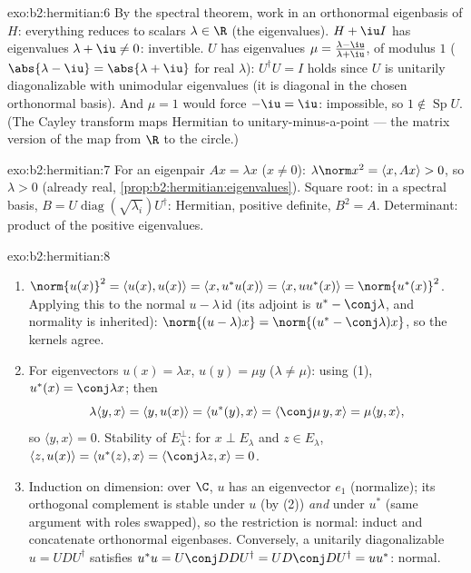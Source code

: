 \begin{solution}{exo:b2:hermitian:6}
By the spectral theorem, work in an orthonormal eigenbasis of $H$:
everything reduces to scalars $\lambda \in \R$ (the eigenvalues).
$H + \iu I$ has eigenvalues $\lambda + \iu \neq 0$: invertible. $U$
has eigenvalues $\mu = \frac{\lambda - \iu}{\lambda + \iu}$, of
modulus $1$ ($\abs{\lambda - \iu} = \abs{\lambda + \iu}$ for real
$\lambda$): $U^\dagger U = I$ holds since $U$ is unitarily
diagonalizable with unimodular eigenvalues (it is diagonal in the
chosen orthonormal basis). And $\mu = 1$ would force $-\iu = \iu$:
impossible, so $1 \notin \operatorname{Sp} U$. (The Cayley
transform maps Hermitian to unitary-minus-a-point --- the matrix
version of the map from $\R$ to the circle.)
\end{solution}

\begin{solution}{exo:b2:hermitian:7}
For an eigenpair $Ax = \lambda x$ ($x \neq 0$): $\lambda\norm x^2 =
\langle x, Ax\rangle > 0$, so $\lambda > 0$ (already real,
\cref{prop:b2:hermitian:eigenvalues}). Square root: in a spectral
basis, $B = U\operatorname{diag}(\sqrt{\lambda_i})U^\dagger$:
Hermitian, positive definite, $B^2 = A$. Determinant: product of
the positive eigenvalues.
\end{solution}

\begin{solution}{exo:b2:hermitian:8}
\begin{enumerate}
  \item $\norm{u(x)}^2 = \langle u(x), u(x)\rangle = \langle x,
        u^*u(x)\rangle = \langle x, uu^*(x)\rangle =
        \norm{u^*(x)}^2$. Applying this to the normal $u -
        \lambda\,\mathrm{id}$ (its adjoint is $u^* -
        \conj\lambda$, and normality is inherited): $\norm{(u -
        \lambda)x} = \norm{(u^* - \conj\lambda)x}$, so the kernels
        agree.
  \item For eigenvectors $u(x) = \lambda x$, $u(y) = \mu y$
        ($\lambda \neq \mu$): using (1), $u^*(x) = \conj\lambda x$;
        then
        \[
        \lambda\langle y, x\rangle = \langle y, u(x)\rangle
        = \langle u^*(y), x\rangle = \langle \conj\mu\, y, x\rangle
        = \mu \langle y, x\rangle ,
        \]
        so $\langle y, x\rangle = 0$. Stability of $E_\lambda^\perp$:
        for $x \perp E_\lambda$ and $z \in E_\lambda$, $\langle z,
        u(x)\rangle = \langle u^*(z), x\rangle =
        \langle\conj\lambda z, x\rangle = 0$.
  \item Induction on dimension: over $\C$, $u$ has an eigenvector
        $e_1$ (normalize); its orthogonal complement is stable
        under $u$ (by (2)) \emph{and} under $u^*$ (same argument
        with roles swapped), so the restriction is normal: induct
        and concatenate orthonormal eigenbases. Conversely, a
        unitarily diagonalizable $u = UDU^\dagger$ satisfies $u^*u
        = U\conj D D U^\dagger = U D\conj D U^\dagger = uu^*$:
        normal.
\end{enumerate}
\end{solution}

